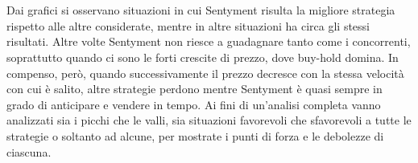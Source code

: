 \documentclass[a4paper,12pt]{report}
\begin{document}
\begin{fig}
\begin{fig}
\end{fig}
\\~\\Dai grafici si osservano situazioni in cui Sentyment risulta la migliore strategia rispetto alle altre considerate, mentre in altre situazioni ha circa gli stessi risultati. Altre volte Sentyment non riesce a guadagnare tanto come i concorrenti, soprattutto quando ci sono le forti crescite di prezzo, dove buy-hold domina. In compenso, però, quando successivamente il prezzo decresce con la stessa velocità con cui è salito, altre strategie perdono mentre Sentyment è quasi sempre in grado di anticipare e vendere in tempo. Ai fini di un'analisi completa vanno analizzati sia i picchi che le valli, sia situazioni favorevoli che sfavorevoli a tutte le strategie o soltanto ad alcune, per mostrate i punti di forza e le debolezze di ciascuna.\\

\end{fig}
\end{document}
